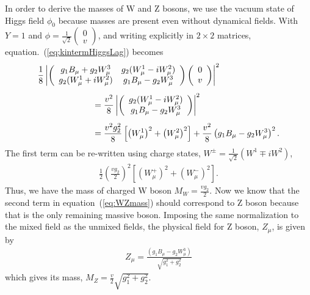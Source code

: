 In order to derive the masses of W and Z bosons, we use the vacuum state of Higgs field $\phi_0$
because masses are present even without dynamical fields.  
With $Y=1$ and $\displaystyle \phi = \frac{1}{\sqrt{2}} 
\left(  \begin{array}{c} 0 \\ v \end{array} \right)$, 
and writing explicitly in $2\times2$ matrices, equation.~(\ref{eq:kintermHiggsLag}) becomes 
\begin{eqnarray}
\label{eq:WZmass}
\begin{array}{ccc} \multicolumn{2}{c}{ \displaystyle \vspace{0.3cm}   
\frac{1}{8} \left| \left(  \begin{array}{cc} 
g_1 B_\mu + g_2 W_\mu^3     & g_2 (W_\mu^1 - iW_\mu^2) \\
g_2 (W_\mu^1 + iW_\mu^2)    & g_1 B_\mu - g_2 W_\mu^3 \end{array} \right) 
\left(  \begin{array}{c} 0 \\ v \end{array} \right) \right|^2 
} & \\ & \multicolumn{2}{l}{\hspace{2cm} \vspace{0.3cm} \displaystyle   
= \frac{v^2}{8} \left| \left(  \begin{array}{c} 
g_2 (W_\mu^1 - iW_\mu^2) \\
g_1 B_\mu - g_2 W_\mu^3 
\end{array} \right) \right|^2} \\  
& \multicolumn{2}{l}{\hspace{2cm}  \displaystyle   
=   
\frac{v^2 g_2^2}{8} \left[ \left( W_\mu^1 \right)^2  + \left( W_\mu^2 \right)^2 \right] 
+ \frac{v^2}{8} \left( g_1 B_\mu - g_2 W_\mu^3 \right)^2.
} \end{array}    
\end{eqnarray} 
The first term can be re-written using charge states, 
$\displaystyle W^\pm = \frac{1}{\sqrt{2}} \left( W^1 \mp iW^2 \right)$, 
\begin{eqnarray}
\frac{1}{2} \left( \frac{v g_2}{2} \right)^2 
\left[ \left( W_\mu^+ \right)^2  + \left( W_\mu^- \right)^2 \right]. 
\end{eqnarray} 
Thus, we have the mass of charged W boson $\displaystyle M_W = \frac{v g_2}{2}$.
Now we know that the second term in equation~(\ref{eq:WZmass}) should correspond to 
Z boson because that is the only remaining massive boson. Imposing the same 
normalization to the mixed field as the unmixed fields, the physical field for 
Z boson, $Z_\mu$, is given by
\begin{eqnarray} 
Z_\mu = \frac{\left( g_1 B_\mu - g_2 W_\mu^3 \right)}{\sqrt{g_1^2+g_2^2}}  
\end{eqnarray} 
which gives its mass, $\displaystyle M_Z = \frac{v}{2} \sqrt{g_1^2+g_2^2}$. 

